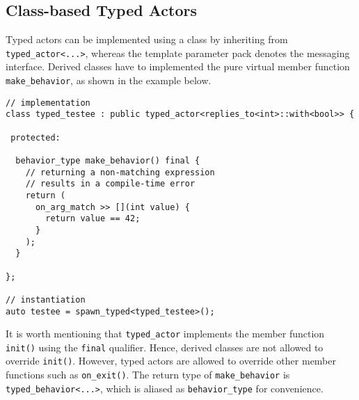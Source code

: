 \clearpage
\subsection{Class-based Typed Actors}

Typed actors can be implemented using a class by inheriting from \lstinline^typed_actor<...>^, whereas the template parameter pack denotes the messaging interface.
Derived classes have to implemented the pure virtual member function \lstinline^make_behavior^, as shown in the example below.

\begin{lstlisting}
// implementation
class typed_testee : public typed_actor<replies_to<int>::with<bool>> {

 protected:

  behavior_type make_behavior() final {
    // returning a non-matching expression 
    // results in a compile-time error
    return (
      on_arg_match >> [](int value) {
        return value == 42;
      }
    );
  }

};

// instantiation
auto testee = spawn_typed<typed_testee>();
\end{lstlisting}

It is worth mentioning that \lstinline^typed_actor^ implements the member function \lstinline^init()^ using the \lstinline^final^ qualifier.
Hence, derived classes are not allowed to override \lstinline^init()^.
However, typed actors are allowed to override other member functions such as \lstinline^on_exit()^.
The return type of \lstinline^make_behavior^ is \lstinline^typed_behavior<...>^, which is aliased as \lstinline^behavior_type^ for convenience.
